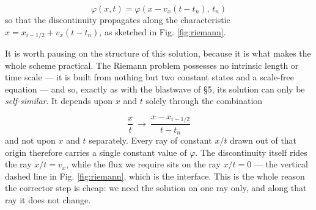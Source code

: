 \documentclass[notoc]{tufte-handout}
\begin{document}
\begin{equation}
\varphi(x,t) = \varphi\left(x - v_x (t - t_n),\, t_n \right)
\end{equation}
%
so that the discontinuity propagates along the characteristic $x = x_{i-1/2} + v_x (t-t_n)$, as sketched in Fig. \ref{fig:riemann}.

It is worth pausing on the structure of this solution, because it is what makes the whole scheme practical. The Riemann problem possesses no intrinsic length or time scale --- it is built from nothing but two constant states and a scale-free equation --- and so, exactly as with the blastwave of \S 5, its solution can only be {\it self-similar}. It depends upon $x$ and $t$ solely through the combination 

\begin{equation}
\frac{x}{t} ~\longrightarrow~ \frac{x - x_{i-1/2}}{t - t_n}
\end{equation}
%
and not upon $x$ and $t$ separately. Every ray of constant $x/t$ drawn out of that origin therefore carries a single constant value of $\varphi$. The discontinuity itself rides the ray $x/t = v_x$, while the flux we require sits on the ray $x/t = 0$ --- the vertical dashed line in Fig. \ref{fig:riemann}, which is the interface. This is the whole reason the corrector step is cheap: we need the solution on one ray only, and along that ray it does not change.
\end{document}
